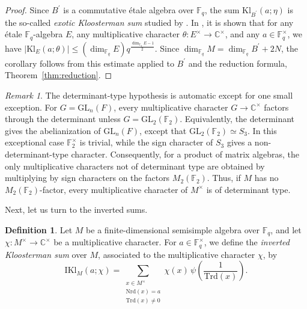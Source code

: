 \documentclass[11pt]{amsart}
\renewcommand{\leq}{\leqslant}
\newcommand{\Kl}{\mathrm{Kl}}
\newcommand{\IKl}{\mathrm{IKl}}
\newcommand{\Nrd}{\mathrm{Nrd}}
\newcommand{\Trd}{\mathrm{Trd}}
\numberwithin{equation}{section}
\theoremstyle{remark}
\newtheorem{remark}[equation]{Remark}
\theoremstyle{plain}
\theoremstyle{definition}
\newtheorem{definition}[equation]{Definition}
\begin{document}
\begin{proof}
Since \(B^{\prime}\) is a commutative étale algebra over
\(\mathbb{F}_q\), the sum \(\Kl_{B^{\prime}}(a;\eta)\) is the
so-called \emph{exotic Kloosterman sum} studied by
\cite{katz_gauss-sums-kloosterman-sums-and-monodromy}.  In
\cite[Theorem~8.8.5]{katz_gauss-sums-kloosterman-sums-and-monodromy},
it is shown that for any étale \(\mathbb{F}_q\)-algebra \(E\), any
multiplicative character
\(\theta\colon E^{\times}\to \mathbb{C}^{\times}\), and any
\(a \in \mathbb{F}_q^{\times}\), we have
\(|\Kl_E(a;\theta)| \leq (\dim_{\mathbb{F}_q} E)
q^{\frac{\dim_{\mathbb{F}_q} E - 1}2}\).  Since
\(\dim_{\mathbb{F}_q} M = \dim_{\mathbb{F}_q} B^{\prime} + 2N\),
the corollary follows from this estimate applied to \(B^{\prime}\) and
the reduction formula,
Theorem~\ref{thm:reduction}.
\end{proof}

\begin{remark}
The determinant-type hypothesis is automatic except for one small
exception.  For \(G=\mathrm{GL}_n(F)\), every multiplicative character
\(G\to\mathbb{C}^{\times}\) factors through the determinant unless
\(G=\mathrm{GL}_2(\mathbb{F}_2)\).  Equivalently, the determinant gives
the abelianization of \(\mathrm{GL}_n(F)\), except that
\(\mathrm{GL}_2(\mathbb{F}_2)\simeq S_3\).  In this exceptional case
\(\mathbb{F}_2^{\times}\) is trivial, while the sign character of
\(S_3\) gives a non-determinant-type character.  Consequently, for a
product of matrix algebras, the only multiplicative characters not of
determinant type are obtained by multiplying by sign characters on the
factors \(M_2(\mathbb{F}_2)\).  Thus, if \(M\) has no
\(M_2(\mathbb{F}_2)\)-factor, every multiplicative character of
\(M^{\times}\) is of determinant type.
\end{remark}


Next, let us turn to the inverted sums.

\begin{definition}
Let \(M\) be a finite-dimensional semisimple algebra over
\(\mathbb{F}_q\), and let
\(\chi\colon M^{\times} \to \mathbb{C}^{\times}\) be a multiplicative
character.  For \(a\in\mathbb{F}_q^\times\), we define the
\emph{inverted Kloosterman sum} over \(M\), associated to the
multiplicative character \(\chi\), by
\begin{equation*}
\IKl_M(a;\chi)
=
\sum_{\substack{x\in M^\times\\ \Nrd(x)=a \\ \Trd(x) \neq 0}}
\chi(x)\,\psi\left( \frac{1}{\Trd(x)} \right).
\end{equation*}
\end{definition}
\end{document}
